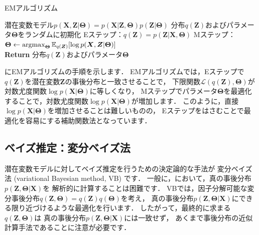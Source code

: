 \begin{algobox}{EMアルゴリズム}
\label{algo:em}
\begin{algorithmic}[1]
\Require 潜在変数モデル$p(\bm{X},\bm{Z}|\bm\Theta) = p(\bm{X}|\bm{Z},\bm\Theta) p(\bm{Z} | \bm\Theta)$
\State 分布$q(\bm{Z})$およびパラメータ$\bm\Theta$をランダムに初期化
\State Eステップ：$q(\bm{Z}) = p(\bm{Z}|\bm{X},\bm\Theta)$
\State Mステップ：$\bm\Theta \leftarrow \mathop{\mathrm{argmax}}_{\bm\Theta} \mathbb{E}_{q(\bm{Z})}[\log p(\bm{X},\bm{Z}|\bm\Theta)]$
\EndWhile\\
{\bf Return} 分布$q(\bm{Z})$およびパラメータ$\bm\Theta$
\end{algorithmic}
\end{algobox}

にEMアルゴリズムの手順を示します．
EMアルゴリズムでは，Eステップで$q(\bm{Z})$を潜在変数$\bm{Z}$の事後分布と一致させることで，
下限関数$\mathcal{L}(q(\bm{Z}),\bm\Theta)$が対数尤度関数$\log p(\bm{X}|\bm\Theta)$に等しくなり，
Mステップでパラメータ$\bm\Theta$を最適化することで，対数尤度関数$\log p(\bm{X}|\bm\Theta)$が増加します．
このように，直接$\log p(\bm{X}|\bm\Theta)$を増加させることは難しいものの，
Eステップをはさむことで最適化を容易にする補助関数法となっています．

\subsection{ベイズ推定：変分ベイズ法}
\label{sec:vb}

潜在変数モデルに対してベイズ推定を行うための決定論的な手法が
変分ベイズ法 (variational Bayesian method, VB) です．
一般に，において，真の事後分布$p(\bm{Z},\bm\Theta|\bm{X})$を
解析的に計算することは困難です．
VBでは，因子分解可能な変分事後分布$q(\bm{Z},\bm\Theta)=q(\bm{Z})q(\bm\Theta)$を考え，
真の事後分布$p(\bm{Z},\bm\Theta|\bm{X})$にできる限り近づけるような最適化を行います．
したがって，最終的に求まる$q(\bm{Z},\bm\Theta)$は
真の事後分布$p(\bm{Z},\bm\Theta|\bm{X})$には一致せず，
あくまで事後分布の近似計算手法であることに注意が必要です．

